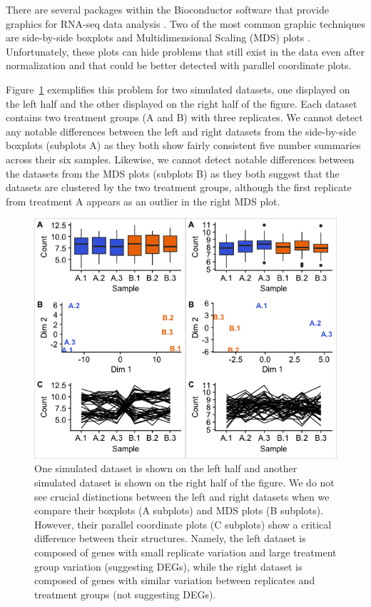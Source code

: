 \documentclass{bioinfo}
\begin{document}
There are several packages within the Bioconductor software that provide graphics for RNA-seq data analysis \citep{Huber}. Two of the most common graphic techniques are side-by-side boxplots and Multidimensional Scaling (MDS) plots \citep{Love, Risso, Robinson, Ritchie}. Unfortunately, these plots can hide problems that still exist in the data even after normalization and that could be better detected with parallel coordinate plots.

Figure~\ref{simulatedData} exemplifies this problem for two simulated datasets, one displayed on the left half and the other displayed on the right half of the figure. Each dataset contains two treatment groups (A and B) with three replicates. We cannot detect any notable differences between the left and right datasets from the side-by-side boxplots (subplots A) as they both show fairly consistent five number summaries across their six samples. Likewise, we cannot detect notable differences between the datasets from the MDS plots (subplots B) as they both suggest that the datasets are clustered by the two treatment groups, although the first replicate from treatment A appears as an outlier in the right MDS plot.

\begin{figure}[!tpb]
\centerline{\includegraphics[width=\columnwidth]{../MakeFigures/simulatedData.jpg}}
\caption{One simulated dataset is shown on the left half and another simulated dataset is shown on the right half of the figure. We do not see crucial distinctions between the left and right datasets when we compare their boxplots (A subplots) and MDS plots (B subplots). However, their parallel coordinate plots (C subplots) show a critical difference between their structures. Namely, the left dataset is composed of genes with small replicate variation and large treatment group variation (suggesting DEGs), while the right dataset is composed of genes with similar variation between replicates and treatment groups (not suggesting DEGs). 
\label{simulatedData}}
\end{figure}
\end{document}
